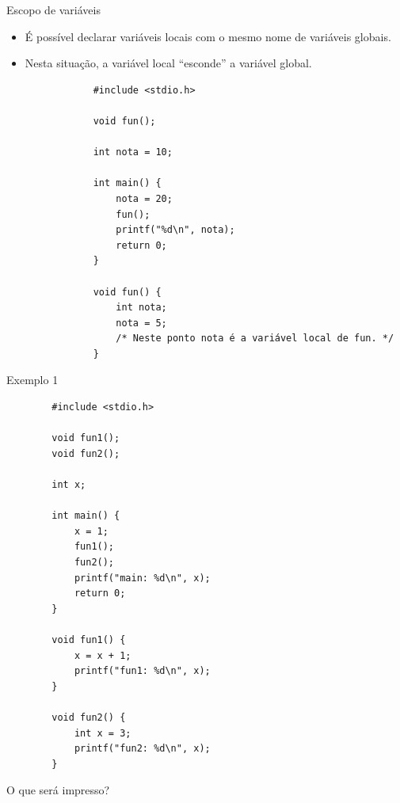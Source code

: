 \documentclass[handout]{beamer}
\begin{document}
\begin{frame}[fragile]{Escopo de variáveis}

    \begin{itemize}
        \item É possível declarar variáveis locais com o mesmo nome de variáveis globais.
        \item Nesta situação, a variável local ``esconde'' a variável global.

        \begin{verbatim}
            #include <stdio.h>
            
            void fun();

            int nota = 10;

            int main() {
                nota = 20;
                fun();
                printf("%d\n", nota);
                return 0;
            }

            void fun() {
                int nota;
                nota = 5;
                /* Neste ponto nota é a variável local de fun. */
            }
        \end{verbatim}
    \end{itemize}
\end{frame}

\begin{frame}[fragile]{Exemplo 1}

    \begin{verbatim}
        #include <stdio.h>

        void fun1();
        void fun2();

        int x;
        
        int main() {
            x = 1;
            fun1();
            fun2();
            printf("main: %d\n", x);
            return 0;
        }

        void fun1() {
            x = x + 1;
            printf("fun1: %d\n", x);
        }

        void fun2() {
            int x = 3;
            printf("fun2: %d\n", x);
        }
    \end{verbatim}
    
    O que será impresso?
\end{frame}
\end{document}
